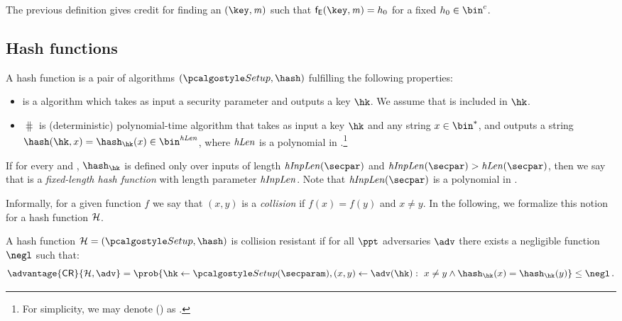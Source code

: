 The previous definition gives credit for finding an $(\key, \msg)$ such that $\FEnc(\key, \msg) = h_0$ for a fixed $h_0 \in \bin^c$.

\subsection{Hash functions}\label{preliminaries:definitions:hash-function}

\begin{definition}
    A hash function \hashSet{} is a pair of algorithms $(\hashSetup, \hash)$ fulfilling the following properties:
    \begin{itemize}
        \item \hashSetup{} is a \ppt{} algorithm which takes as input a security parameter \secparam{} and outputs a key $\hk$. We assume that \secparam{} is included in $\hk$.
        \item $\hash$ is (deterministic) polynomial-time algorithm that takes as input a key $\hk$ and any string $x\in\bin^{*}$, and outputs a string $\hash(\hk, x) = \hash_{\hk}(x)\in\bin^{\hashLen}$, where $\mathit{hLen}$ is a polynomial in \secpar.\footnote{For simplicity, we may denote \hashLen(\secpar) as \hashLen{}.}
    \end{itemize}
    If for every \secpar{} and \hk{}, $\hash_{\hk}$ is defined only over inputs of length $\hashInpLen(\secpar)$ and $\hashInpLen(\secpar) > \hashLen(\secpar)$, then we say that \hashSet{} is a \emph{fixed-length hash function} with length parameter $\mathit{hInpLen}$. Note that $\hashInpLen(\secpar)$ is a polynomial in \secpar.
\end{definition}

Informally, for a given function $f$ we say that $(x,y)$ is a \emph{collision} if $f(x) = f(y)$ and $x \neq y$. In the following, we formalize this notion for a hash function $\mathcal{H}$.

\begin{definition}\label{preliminaries:def:collision-resistance}
    A hash function $\hashSet = (\hashSetup, \hash)$ is collision resistant if for all $\ppt$ adversaries $\adv$ there exists a negligible function $\negl$ such that:
\[
    \advantage{\colres}{\hashSet, \adv} = \prob{
        \hk \gets \hashSetup(\secparam), (x, y) \gets \adv(\hk): \ x \neq y \land \hash_{\hk}(x) = \hash_{\hk}(y)
    } \leq \negl\,.
\]
\end{definition}

